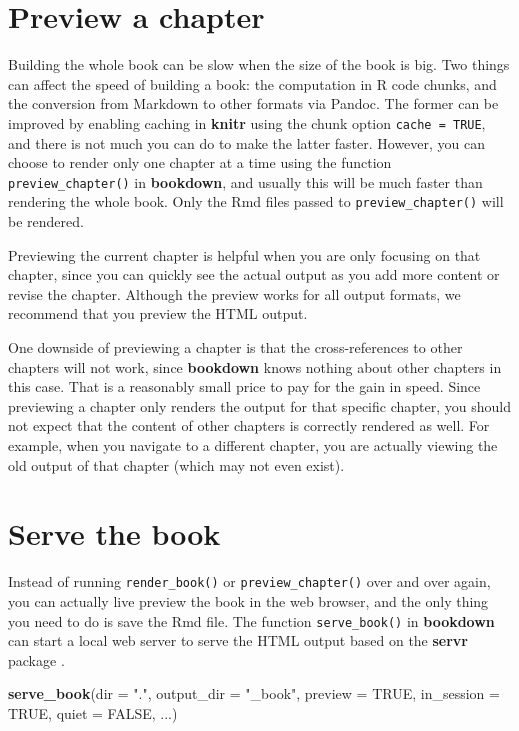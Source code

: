 \documentclass[
  12pt,
]{krantz}
\newenvironment{Shaded}{\begin{snugshade}}{\end{snugshade}}
\newcommand{\AttributeTok}[1]{\textcolor[rgb]{0.13,0.29,0.53}{#1}}
\newcommand{\ConstantTok}[1]{\textcolor[rgb]{0.56,0.35,0.01}{#1}}
\newcommand{\FunctionTok}[1]{\textcolor[rgb]{0.13,0.29,0.53}{\textbf{#1}}}
\newcommand{\NormalTok}[1]{#1}
\newcommand{\StringTok}[1]{\textcolor[rgb]{0.31,0.60,0.02}{#1}}
\theoremstyle{definition}
\theoremstyle{definition}
\theoremstyle{definition}
\theoremstyle{definition}
\theoremstyle{remark}
\begin{document}
\section{Preview a chapter}\label{preview-a-chapter}

Building the whole book can be slow when the size of the book is big. Two things can affect the speed of building a book: the computation in R code chunks, and the conversion from Markdown to other formats via Pandoc. The former can be improved by enabling caching in \textbf{knitr} using the chunk option \texttt{cache\ =\ TRUE}, and there is not much you can do to make the latter faster. However, you can choose to render only one chapter at a time using the function \texttt{preview\_chapter()} in \textbf{bookdown}, and usually this will be much faster than rendering the whole book. Only the Rmd files passed to \texttt{preview\_chapter()} will be rendered.

Previewing the current chapter is helpful when you are only focusing on that chapter, since you can quickly see the actual output as you add more content or revise the chapter. Although the preview works for all output formats, we recommend that you preview the HTML output.

One downside of previewing a chapter is that the cross-references to other chapters will not work, since \textbf{bookdown} knows nothing about other chapters in this case. That is a reasonably small price to pay for the gain in speed. Since previewing a chapter only renders the output for that specific chapter, you should not expect that the content of other chapters is correctly rendered as well. For example, when you navigate to a different chapter, you are actually viewing the old output of that chapter (which may not even exist).

\section{Serve the book}\label{serve-the-book}

Instead of running \texttt{render\_book()} or \texttt{preview\_chapter()} over and over again, you can actually live preview the book in the web browser, and the only thing you need to do is save the Rmd file. The function \texttt{serve\_book()} in \textbf{bookdown} can start a local web server to serve the HTML output based on the \textbf{servr} package \citep{R-servr}.

\begin{Shaded}
\begin{Highlighting}[]
\FunctionTok{serve\_book}\NormalTok{(}\AttributeTok{dir =} \StringTok{"."}\NormalTok{, }\AttributeTok{output\_dir =} \StringTok{"\_book"}\NormalTok{, }\AttributeTok{preview =} \ConstantTok{TRUE}\NormalTok{,}
  \AttributeTok{in\_session =} \ConstantTok{TRUE}\NormalTok{, }\AttributeTok{quiet =} \ConstantTok{FALSE}\NormalTok{, ...)}
\end{Highlighting}
\end{Shaded}
\end{document}
